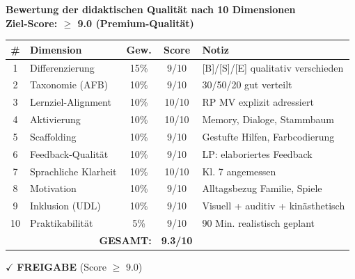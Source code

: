 \documentclass[11pt,a4paper]{article}
\begin{document}
\begin{scorebox}
\textbf{Bewertung der didaktischen Qualität nach 10 Dimensionen}\\
\textbf{Ziel-Score: $\geq$ 9.0 (Premium-Qualität)}

\vspace{1em}
\begin{tabular}{|c|l|c|c|p{4cm}|}
\hline
\textbf{\#} & \textbf{Dimension} & \textbf{Gew.} & \textbf{Score} & \textbf{Notiz} \\
\hline
1 & Differenzierung & 15\% & 9/10 & [B]/[S]/[E] qualitativ verschieden \\
\hline
2 & Taxonomie (AFB) & 10\% & 9/10 & 30/50/20 gut verteilt \\
\hline
3 & Lernziel-Alignment & 10\% & 10/10 & RP MV explizit adressiert \\
\hline
4 & Aktivierung & 10\% & 10/10 & Memory, Dialoge, Stammbaum \\
\hline
5 & Scaffolding & 10\% & 9/10 & Gestufte Hilfen, Farbcodierung \\
\hline
6 & Feedback-Qualität & 10\% & 9/10 & LP: elaboriertes Feedback \\
\hline
7 & Sprachliche Klarheit & 10\% & 10/10 & Kl. 7 angemessen \\
\hline
8 & Motivation & 10\% & 9/10 & Alltagsbezug Familie, Spiele \\
\hline
9 & Inklusion (UDL) & 10\% & 9/10 & Visuell + auditiv + kinästhetisch \\
\hline
10 & Praktikabilität & 5\% & 9/10 & 90 Min. realistisch geplant \\
\hline
\multicolumn{3}{|r|}{\textbf{GESAMT:}} & \textbf{9.3/10} & \\
\hline
\end{tabular}

\vspace{1em}
$\checkmark$ \textcolor{successgreen}{\textbf{FREIGABE} (Score $\geq$ 9.0)}
\end{scorebox}
\end{document}

